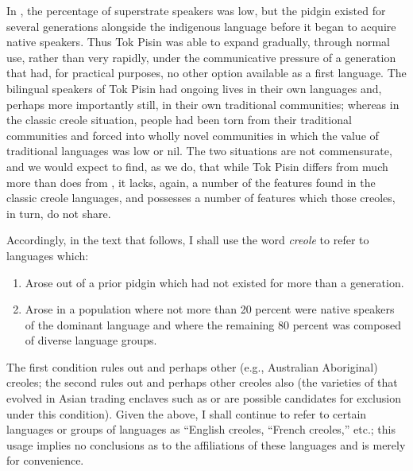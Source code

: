 In , the percentage of superstrate speakers was low, but the pidgin existed for several generations alongside the indigenous language before it began to acquire native speakers. Thus Tok Pisin was able to expand gradually, through normal use, rather than very rapidly, under the communicative pressure of a generation that had, for practical purposes, no other option available as a first language. The bilingual speakers of Tok Pisin had ongoing lives in their own languages and, perhaps more importantly still, in their own traditional communities; whereas in the classic creole situation, people had been torn from their traditional communities and forced into wholly novel communities in which the value of traditional languages was low or nil. The two situations are not commensurate, and we would expect
to find, as we do, that while Tok Pisin differs from  much more than  does from , it lacks, again, a number of the features found in the classic creole languages, and possesses a number of features which those creoles, in turn, do not share.

Accordingly, in the text that follows, I shall use the word \textit{creole}
to refer to languages which:

\begin{enumerate}
\item Arose out of a prior pidgin which had not existed for more than a generation.
\item Arose in a population where not more than 20 percent were native speakers of the dominant language and where the remaining 80 percent was composed of diverse language groups.
\end{enumerate}

The first condition rules out  and perhaps other (e.g., Austra\-lian Aboriginal) creoles; the second rules out  and perhaps other creoles also (the varieties of  that evolved in Asian trading enclaves such as  or  are possible candidates for exclusion under this condition). Given the above, I shall continue to refer to certain languages or groups of languages as ``English creoles,{\textquotedbl} ``French creoles,'' etc.; this usage implies no conclusions as to the affiliations of these languages and is merely for convenience.


